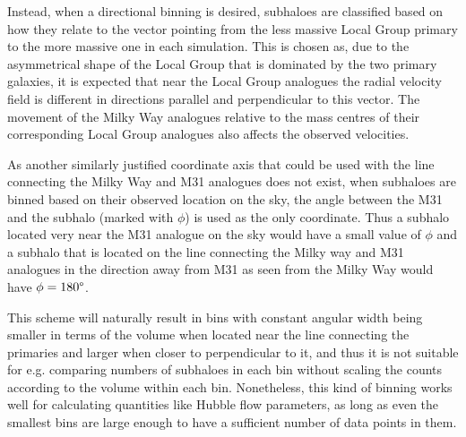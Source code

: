 \documentclass[english, oneside]{HYgradu}
\begin{document}
Instead, when a directional binning is desired, subhaloes are classified based on how they relate to the vector pointing from the less massive Local Group primary to the more massive one in each simulation. This is chosen as, due to the asymmetrical shape of the Local Group that is dominated by the two primary galaxies, it is expected that near the Local Group analogues the radial velocity field is different in directions parallel and perpendicular to this vector. The movement of the Milky Way analogues relative to the mass centres of their corresponding Local Group analogues also affects the observed velocities.

As another similarly justified coordinate axis that could be used with the line connecting the Milky Way and M31 analogues does not exist, when subhaloes are binned based on their observed location on the sky, the angle between the M31 and the subhalo (marked with $\phi$) is used as the only coordinate. Thus a subhalo located very near the M31 analogue on the sky would have a small value of $\phi$ and a subhalo that is located on the line connecting the Milky way and M31 analogues in the direction away from M31 as seen from the Milky Way would have $\phi = 180 \degree$.

This scheme will naturally result in bins with constant angular width being smaller in terms of the volume when located near the line connecting the primaries and larger when closer to perpendicular to it, and thus it is not suitable for e.g. comparing numbers of subhaloes in each bin without scaling the counts according to the volume within each bin. Nonetheless, this kind of binning works well for calculating quantities like Hubble flow parameters, as long as even the smallest bins are large enough to have a sufficient number of data points in them.
\end{document}
